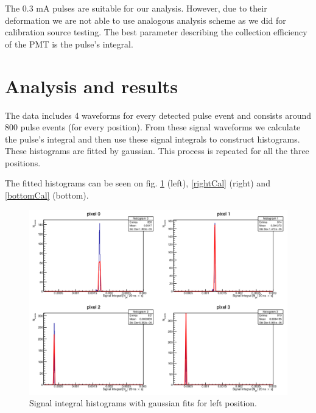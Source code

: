 \par
The 0.3 mA pulses are suitable for our analysis. However, due to their deformation we are not able to use analogous analysis scheme as we did for calibration source testing. The best parameter describing the collection efficiency of the PMT is the pulse's integral. 


\section{Analysis and results}
The data includes 4 waveforms for every detected pulse event and consists around 800 pulse events (for every position). From these signal waveforms we calculate the pulse's integral and then use these signal integrals to construct histograms. These histograms are fitted by gaussian. This process is repeated for all the three positions.
\par
The fitted histograms can be seen on fig. \ref{leftCal} (left), \ref{rightCal} (right) and \ref{bottomCal} (bottom).
\begin{figure}[H]
 \centering
 \includegraphics[scale=0.35, angle = 0]{./pictures/left.png}
 \caption{Signal integral histograms with gaussian fits for left position.}
 \label{leftCal}
 
\end{figure}
